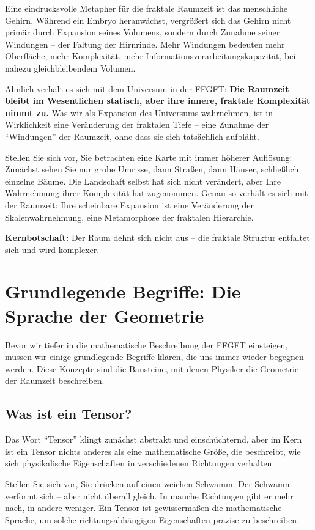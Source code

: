 Eine eindrucksvolle Metapher für die fraktale Raumzeit ist das menschliche Gehirn. Während ein Embryo heranwächst, vergrößert sich das Gehirn nicht primär durch Expansion seines Volumens, sondern durch Zunahme seiner Windungen – der Faltung der Hirnrinde. Mehr Windungen bedeuten mehr Oberfläche, mehr Komplexität, mehr Informationsverarbeitungskapazität, bei nahezu gleichbleibendem Volumen. 

Ähnlich verhält es sich mit dem Universum in der FFGFT: \textbf{Die Raumzeit bleibt im Wesentlichen statisch, aber ihre innere, fraktale Komplexität nimmt zu.} Was wir als Expansion des Universums wahrnehmen, ist in Wirklichkeit eine Veränderung der fraktalen Tiefe – eine Zunahme der \enquote{Windungen} der Raumzeit, ohne dass sie sich tatsächlich aufbläht.

Stellen Sie sich vor, Sie betrachten eine Karte mit immer höherer Auflösung: Zunächst sehen Sie nur grobe Umrisse, dann Straßen, dann Häuser, schließlich einzelne Bäume. Die Landschaft selbst hat sich nicht verändert, aber Ihre Wahrnehmung ihrer Komplexität hat zugenommen. Genau so verhält es sich mit der Raumzeit: Ihre scheinbare Expansion ist eine Veränderung der Skalenwahrnehmung, eine Metamorphose der fraktalen Hierarchie.

\textbf{Kernbotschaft:} Der Raum dehnt sich nicht aus – die fraktale Struktur entfaltet sich und wird komplexer.

\section{Grundlegende Begriffe: Die Sprache der Geometrie}

Bevor wir tiefer in die mathematische Beschreibung der FFGFT einsteigen, müssen wir einige grundlegende Begriffe klären, die uns immer wieder begegnen werden. Diese Konzepte sind die Bausteine, mit denen Physiker die Geometrie der Raumzeit beschreiben.

\subsection{Was ist ein Tensor?}

Das Wort \enquote{Tensor} klingt zunächst abstrakt und einschüchternd, aber im Kern ist ein Tensor nichts anderes als eine mathematische Größe, die beschreibt, wie sich physikalische Eigenschaften in verschiedenen Richtungen verhalten. 

Stellen Sie sich vor, Sie drücken auf einen weichen Schwamm. Der Schwamm verformt sich – aber nicht überall gleich. In manche Richtungen gibt er mehr nach, in andere weniger. Ein Tensor ist gewissermaßen die mathematische Sprache, um solche richtungsabhängigen Eigenschaften präzise zu beschreiben.

